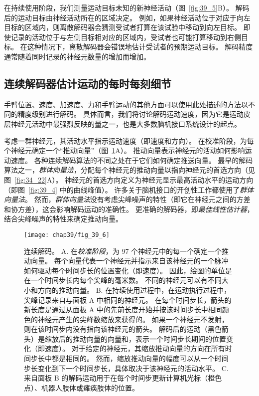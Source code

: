 在持续使用阶段，我们测量运动目标未知的新神经活动（图~\ref{fig:39_5}B）。
解码后的运动目标由神经活动所在的区域决定。
例如，如果神经活动位于对应于向左目标的区域内，则离散解码器会猜测受试者打算在该试验中移动到向左目标。 
即使记录的活动位于与左侧目标相对应的区域内，受试者也可能打算移动到右侧目标。
在这种情况下，离散解码器会错误地估计受试者的预期运动目标。
解码精度通常随着同时记录的神经元数量的增加而增加。



\subsection{连续解码器估计运动的每时每刻细节}

手臂位置、速度、加速度、力和手臂运动的其他方面可以使用此处描述的方法以不同的精度级别进行解码。
具体而言，我们将讨论解码运动速度，因为它是运动皮层神经元活动中最强烈反映的量之一，也是大多数脑机接口系统设计的起点。


考虑一群神经元，其活动水平指示运动速度（即速度和方向）。
在校准阶段，为每个神经元确定一个“推动向量”（图~\ref{fig:39_6}A）。
推动向量表示神经元的活动如何影响运动速度。
各种连续解码算法的不同之处在于它们如何确定推送向量。
最早的解码算法之一，\textit{群体向量法}，分配每个神经元的推动向量以指向神经元的首选方向（见图~\ref{fig:34_22}A）。
神经元的首选方向定义为神经元显示最高活动水平的运动方向（即图~\ref{fig:39_4} 中的曲线峰值）。
许多关于脑机接口的开创性工作都使用了\textit{群体向量法}。
然而，\textit{群体向量法}没有考虑尖峰噪声的特性（即它在神经元之间的方差和协方差），这会影响解码运动的准确性。
更准确的解码器，即\textit{最佳线性估计器}，结合尖峰噪声的特性来确定推动向量。


\begin{figure}[htbp]
	\centering
	\texttt{[image: chap39/fig\_39\_6]}
	\caption{连续解码。
		A. 在\textit{校准阶段}，为 97 个神经元中的每一个确定一个推动向量。
		每个向量代表一个神经元并指示来自该神经元的一个脉冲如何驱动每个时间步长的位置变化（即速度）。
		因此，绘图的单位是在一个时间步长内每个尖峰的毫米数。
		不同的神经元可以有不同大小和方向的推动向量。
		B. 在持续使用过程中，在运动执行过程中，尖峰记录来自与面板 A 中相同的神经元。
		在每个时间步长，箭头的新长度是通过从面板 A 中的先前长度开始并按该时间步长中相同颜色的神经元产生的尖峰数缩放来获得的。
		如果一个神经元不发射，则在该时间步内没有指向该神经元的箭头。
		解码后的运动（黑色箭头）是缩放后的推动向量的向量和，表示一个时间步长期间的位置变化（即速度）。
		对于给定的神经元，其缩放推动向量的方向在所有时间步长中都是相同的。
		然而，缩放推动向量的幅度可以从一个时间步长变化到下一个时间步长，具体取决于该神经元的活动水平。
		C. 来自面板 B 的解码运动用于在每个时间步更新计算机光标（橙色点）、机器人肢体或瘫痪肢体的位置。}
	\label{fig:39_6}
\end{figure}


